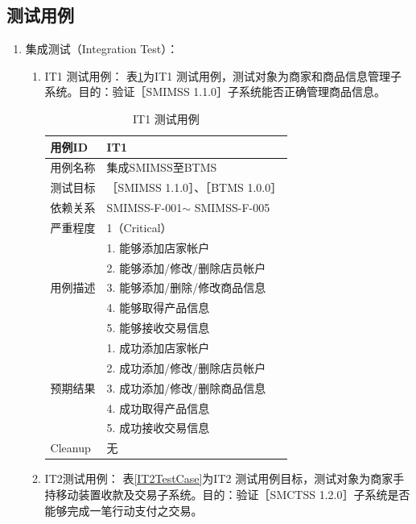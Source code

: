 		\subsection{测试用例}
			\begin{enumerate}

			\item 集成测试（Integration Test）：
				\begin{enumerate}

				\item IT1 测试用例：
					表\ref{IT1TestCase}为IT1 测试用例，测试对象为商家和商品信息管理子系统。目的：验证［SMIMSS 1.1.0］子系统能否正确管理商品信息。

					\begin{table}[!htbp]
					\centering
					\caption{IT1 测试用例}
					\label{IT1TestCase}
					\begin{tabular}{|l|l|}
					\hline
					用例ID & IT1 \\ \hline
					用例名称 & 集成SMIMSS至BTMS \\ \hline
					测试目标 & {［}SMIMSS 1.1.0{］}、{［}BTMS 1.0.0{］} \\ \hline
					依赖关系 & SMIMSS-F-001$\sim$ SMIMSS-F-005 \\ \hline
					严重程度 & 1（Critical） \\ \hline
					\multirow{5}{*}{用例描述} & 1.     能够添加店家帐户 \\ \cline{2-2} 
					 & 2.     能够添加/修改/删除店员帐户 \\ \cline{2-2} 
					 & 3.     能够添加/删除/修改商品信息 \\ \cline{2-2} 
					 & 4.     能够取得产品信息 \\ \cline{2-2} 
					 & 5.     能够接收交易信息 \\ \hline
					\multirow{5}{*}{预期结果} & 1.     成功添加店家帐户 \\ \cline{2-2} 
					 & 2.     成功添加/修改/删除店员帐户 \\ \cline{2-2} 
					 & 3.     成功添加/修改/删除商品信息 \\ \cline{2-2} 
					 & 4.     成功取得产品信息 \\ \cline{2-2} 
					 & 5.     成功接收交易信息 \\ \hline
					Cleanup & 无 \\ \hline
					\end{tabular}
					\end{table}


				\item IT2测试用例：
					表\ref{IT2TestCase}为IT2 测试用例目标，测试对象为商家手持移动装置收款及交易子系统。目的：验证［SMCTSS 1.2.0］子系统是否能够完成一笔行动支付之交易。


\end{enumerate}
\end{enumerate}
